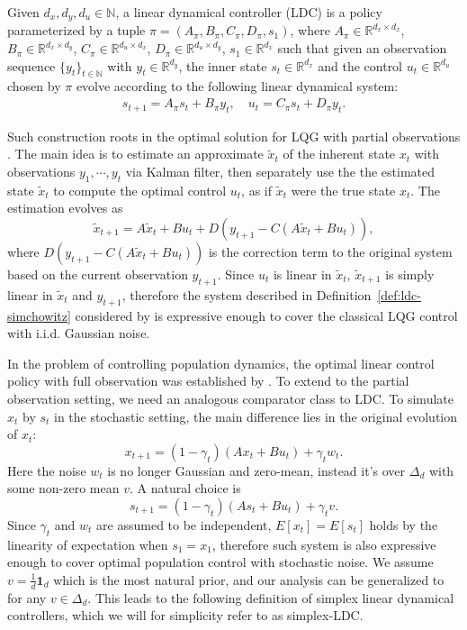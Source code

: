 \begin{definition}
\label{def:ldc-simchowitz}
Given $d_x, d_y, d_u\in\mathbb{N}$, a linear dynamical controller (LDC) is a policy parameterized by a tuple $\pi=(A_{\pi}, B_{\pi}, C_{\pi}, D_{\pi}, s_1)$, where $A_{\pi}\in\mathbb{R}^{d_x\times d_x}$, $B_{\pi}\in\mathbb{R}^{d_x\times d_{y}}$,
$C_{\pi}\in\mathbb{R}^{d_{u}\times d_x}$,
$D_{\pi}\in\mathbb{R}^{d_{u}\times d_{y}}$, $s_1\in\mathbb{R}^{d_x}$ such that given an observation sequence $\{y_t\}_{t\in\mathbb{N}}$ with $y_t\in\mathbb{R}^{d_y}$, the inner state $s_t\in\mathbb{R}^{d_x}$ and the control $u_t\in\mathbb{R}^{d_u}$ chosen by $\pi$ evolve according to the following linear dynamical system:
\begin{align*}
s_{t+1}=A_{\pi}s_t+B_{\pi}y_t, \quad u_t=C_{\pi}s_t+D_{\pi}y_t. 
\end{align*}
\end{definition}
Such construction roots in the optimal solution for LQG with partial observations \citep{bacsar2008h}. The main idea is to estimate an approximate $\tilde{x}_t$ of the inherent state $x_t$ with observations $y_1,\cdots,y_t$ via Kalman filter, then separately use the the estimated state $\tilde{x}_t$ to compute the optimal control $u_t$, as if $\tilde{x}_t$ were the true state $x_t$. The estimation evolves as 
$$\tilde{x}_{t+1}=A \tilde{x}_t+Bu_t+D(y_{t+1}-C(A \tilde{x}_t+Bu_t)),$$
where $D(y_{t+1}-C(A \tilde{x}_t+Bu_t))$ is the correction term to the original system based on the current observation $y_{t+1}$. Since $u_t$ is linear in $\tilde{x}_t$, $\tilde{x}_{t+1}$ is simply linear in $\tilde{x}_t$ and $y_{t+1}$, therefore the system described in Definition~\ref{def:ldc-simchowitz} considered by \cite{simchowitz2020improper} is expressive enough to cover the classical LQG control with i.i.d. Gaussian noise.

In the problem of controlling population dynamics, the optimal linear control policy with full observation was established by \cite{golowich2024online}. To extend to the partial observation setting, we need an analogous comparator class to LDC. To simulate $x_t$ by $s_t$ in the stochastic setting, the main difference lies in the original evolution of $x_t$:
$$
x_{t+1}=(1-\gamma_t)(Ax_t+Bu_t)+\gamma_t w_t.
$$
Here the noise $w_t$ is no longer Gaussian and zero-mean, instead it's over $\Delta_d$ with some non-zero mean $v$. A natural choice is
$$
s_{t+1}=(1-\gamma_t)(As_t+Bu_t)+\gamma_t v.
$$
Since $\gamma_t$ and $w_t$ are assumed to be independent, $E[x_t]=E[s_t]$ holds by the linearity of expectation when $s_1=x_1$, therefore such system is also expressive enough to cover optimal population control with stochastic noise. We assume $v=\frac{1}{d} \mathbf{1}_d$ which is the most natural prior, and our analysis can be generalized to for any $v\in \Delta_d$. This leads to the following definition of simplex linear dynamical controllers, which we will for simplicity refer to as simplex-LDC. 

